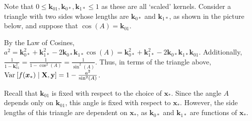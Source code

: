 \documentclass[11pt]{article}
\numberwithin{figure}{section}
\numberwithin{equation}{section}
\def\BayesOpt{\texttt{BayesOpt}}
\newcommand{\bs}[1]{\boldsymbol{#1}}
\def\bsx{\bs{x}}
\def\bsk{\bs{k}}
\def\xast{\bsx_{*}}
\begin{document}
Note that $0 \le \bsk_{01}, \bsk_{0*}, \bsk_{1*} \le 1$ as these are all `scaled' kernels. Consider a triangle with two sides whose lengths are $\bsk_{0*}$ and $\bsk_{1*}$, as shown in the picture below, and suppose that $\cos(A) = \bsk_{01}$.

\vspace*{1.0cm}
\begin{center}
\end{center}

By the Law of Cosines, $a^2 = \bsk_{0*}^2 + \bsk_{1*}^{2} - 2\bsk_{0*}\bsk_{1*}\cos(A) = \bsk_{0*}^2 + \bsk_{1*}^{2} - 2\bsk_{0*}\bsk_{1*}\bsk_{01}$. Additionally, $\frac{1}{1 - \bsk_{01}^{2}} = \frac{1}{1 - \cos^{2}(A)} = \frac{1}{\sin^{2}(A)}$. Thus, in terms of the triangle above, $\var{f(\xast) \mid \mathbf{X}, \mathbf{y}} = 1 - \frac{a^2}{\sin^2(A)}$.

Recall that $\bsk_{01}$ is fixed with respect to the choice of $\xast$. Since the angle $A$ depends only on $\bsk_{01}$, this angle is fixed with respect to $\xast$. However, the side lengths of this triangle are dependent on $\xast$, as $\bsk_{0*}$ and $\bsk_{1*}$ are functions of $\xast$. 
\end{document}
